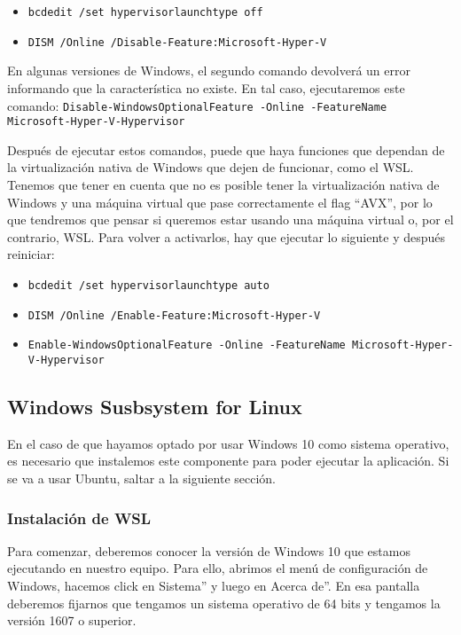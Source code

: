 \begin{itemize}
    \item \texttt{bcdedit /set hypervisorlaunchtype off}
    \item \texttt{DISM /Online /Disable-Feature:Microsoft-Hyper-V}
\end{itemize}

En algunas versiones de Windows, el segundo comando devolverá un error informando que la característica no existe. En tal caso, ejecutaremos este comando: \newline \texttt{Disable-WindowsOptionalFeature -Online -FeatureName \newline Microsoft-Hyper-V-Hypervisor}

Después de ejecutar estos comandos, puede que haya funciones que dependan de la virtualización nativa de Windows que dejen de funcionar, como el WSL. Tenemos que tener en cuenta que no es posible tener la virtualización nativa de Windows y una máquina virtual que pase correctamente el flag ``AVX'', por lo que tendremos que pensar si queremos estar usando una máquina virtual o, por el contrario, WSL. Para volver a activarlos, hay que ejecutar lo siguiente y después reiniciar:

\begin{itemize}
    \item \texttt{bcdedit /set hypervisorlaunchtype auto}
    \item \texttt{DISM /Online /Enable-Feature:Microsoft-Hyper-V}
    \item \texttt{Enable-WindowsOptionalFeature -Online -FeatureName \newline Microsoft-Hyper-V-Hypervisor}
\end{itemize}

\subsection{Windows Susbsystem for Linux}
En el caso de que hayamos optado por usar Windows 10 como sistema operativo, es necesario que instalemos este componente para poder ejecutar la aplicación. Si se va a usar Ubuntu, saltar a la siguiente sección.

\subsubsection{Instalación de WSL}
Para comenzar, deberemos conocer la versión de Windows 10 que estamos ejecutando en nuestro equipo. Para ello, abrimos el menú de configuración de Windows, hacemos click en Sistema'' y luego en Acerca de''. En esa pantalla deberemos fijarnos que tengamos un sistema operativo de 64 bits y tengamos la versión 1607 o superior.

